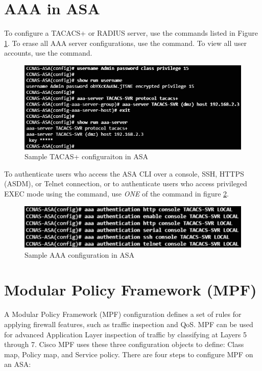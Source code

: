 \section{AAA in ASA}

To configure a TACACS+ or RADIUS server, use the commands listed in Figure \ref{sampleTACASasa}. To erase all AAA server configurations, use the  command. To view all user accounts, use the  command.\\

\begin{figure}[hbtp]
\caption{Sample TACAS+ configuraiton in ASA}\label{sampleTACASasa}
\centering
\includegraphics[scale=0.7]{pictures/sampleTACASasa.PNG}
\end{figure}


To authenticate users who access the ASA CLI over a console, SSH, HTTPS (ASDM), or Telnet connection, or to authenticate users who access privileged EXEC mode using the  command, use \emph{ONE} of the command in figure \ref{AAAconfigASA}.

\begin{figure}[hbtp]
\caption{Sample AAA configuration in ASA}\label{AAAconfigASA}
\centering
\includegraphics[scale=1]{pictures/AAAconfigASA.PNG}
\end{figure}


\section{Modular Policy Framework (MPF)}

A Modular Policy Framework (MPF) configuration defines a set of rules for applying firewall features, such as traffic inspection and QoS. MPF can be used for advanced Application Layer inspection of traffic by classifying at Layers 5 through 7. Cisco MPF uses these three configuration objects to define: Class map, Policy map, and Service policy. There are four steps to configure MPF on an ASA:


